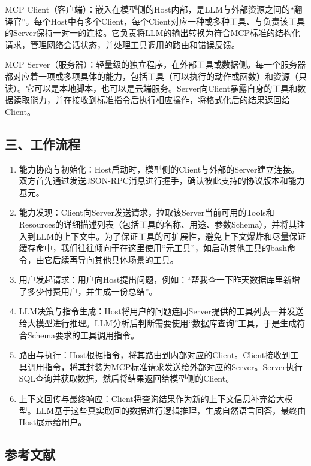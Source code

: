 MCP Client（客户端）：嵌入在模型侧的Host内部，是LLM与外部资源之间的``翻译官''。每个Host中有多个Client，每个Client对应一种或多种工具、与负责该工具的Server保持一对一的连接。它负责将LLM的输出转换为符合MCP标准的结构化请求，管理网络会话状态，并处理工具调用的路由和错误反馈。

MCP Server（服务器）：轻量级的独立程序，在外部工具或数据侧。每一个服务器都对应着一项或多项具体的能力，包括工具（可以执行的动作或函数）和资源（只读）。它可以是本地脚本，也可以是云端服务。Server向Client暴露自身的工具和数据读取能力，并在接收到标准指令后执行相应操作，将格式化后的结果返回给Client。

\hypertarget{ux4e09ux5de5ux4f5cux6d41ux7a0b}{%
\subsection{三、工作流程}\label{ux4e09ux5de5ux4f5cux6d41ux7a0b}}

\begin{enumerate}
\def\labelenumi{\arabic{enumi}.}
\item
  能力协商与初始化：Host启动时，模型侧的Client与外部的Server建立连接。双方首先通过发送JSON-RPC消息进行握手，确认彼此支持的协议版本和能力基元。
\item
  能力发现：Client向Server发送请求，拉取该Server当前可用的Tools和Resources的详细描述列表（包括工具的名称、用途、参数Schema），并将其注入到LLM的上下文中。为了保证工具的可扩展性，避免上下文爆炸和尽量保证缓存命中，我们往往倾向于在这里使用``元工具''，如启动其他工具的bash命令，由它后续再导向其他具体场景的工具。
\item
  用户发起请求：用户向Host提出问题，例如：``帮我查一下昨天数据库里新增了多少付费用户，并生成一份总结''。
\item
  LLM决策与指令生成：Host将用户的问题连同Server提供的工具列表一并发送给大模型进行推理。LLM分析后判断需要使用``数据库查询''工具，于是生成符合Schema要求的工具调用指令。
\item
  路由与执行：Host根据指令，将其路由到内部对应的Client。Client接收到工具调用指令，将其封装为MCP标准请求发送给外部对应的Server。Server执行SQL查询并获取数据，然后将结果返回给模型侧的Client。
\item
  上下文回传与最终响应：Client将查询结果作为新的上下文信息补充给大模型。LLM基于这些真实取回的数据进行逻辑推理，生成自然语言回答，最终由Host展示给用户。
\end{enumerate}

\hypertarget{ux53c2ux8003ux6587ux732e-121}{%
\subsection{参考文献}\label{ux53c2ux8003ux6587ux732e-121}}

